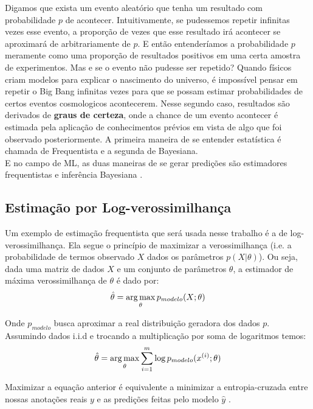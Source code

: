 Digamos que exista um evento aleatório que tenha um resultado com probabilidade $p$ de acontecer. Intuitivamente, se pudessemos repetir infinitas vezes esse evento, a proporção de vezes que esse resultado irá acontecer se aproximará de arbitrariamente de $p$. E então entenderíamos a probabilidade $p$ meramente como uma proporção de resultados positivos em uma certa amostra de experimentos. Mas e se o evento não pudesse ser repetido? Quando físicos criam modelos para explicar o nascimento do universo, é impossível pensar em repetir o Big Bang infinitas vezes para que se possam estimar probabilidades de certos eventos cosmologicos acontecerem. Nesse segundo caso, resultados são derivados de \textbf{graus de certeza}, onde a chance de um evento acontecer é estimada pela aplicação de conhecimentos prévios em vista de algo que foi observado posteriormente. A primeira maneira de se entender estatística é chamada de Frequentista e a segunda de Bayesiana. \\

E no campo de ML, as duas maneiras de se gerar predições são estimadores frequentistas e inferência Bayesiana \citep{dlbook}.

\subsection{Estimação por Log-verossimilhança}
 
Um exemplo de estimação frequentista que será usada nesse trabalho é a de log-verossimilhança. 
Ela segue o princípio de maximizar a verossimilhança (i.e. a probabilidade de
termos observado $X$ dados os parâmetros $p(X | \theta)$). Ou seja, dada uma matriz de dados $X$ e um conjunto de parâmetros $\theta$, a estimador de máxima verossimilhança de $\theta$ é dado por: \\

\[ \hat{\theta} = \operatorname*{arg\,max}_{\theta} p_{modelo}(X;\theta) \] 

Onde $p_{modelo}$ busca aproximar a real distribuição geradora dos dados $p$. Assumindo dados i.i.d e trocando a multiplicação por soma de logaritmos temos: \\

\[ \hat{\theta} = \operatorname*{arg\,max}_{\theta} \sum_{i=1}^{m} \log p_{modelo}(x^{(i)};\theta) \]

Maximizar a equação anterior é equivalente a minimizar a entropia-cruzada entre
nossas anotações reais $y$ e as predições feitas pelo modelo $\hat{y}$
\citep{dlbook}. \\

